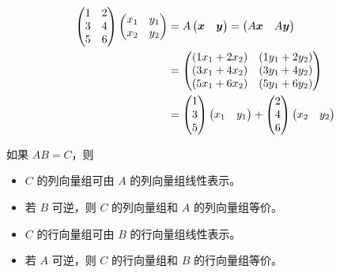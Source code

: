 \[ \begin{aligned}
		\begin{pmatrix}
			1 & 2 \\ 3 & 4 \\ 5 & 6
		\end{pmatrix} \begin{pmatrix}
			              x_1 & y_1 \\ x_2 & y_2
		              \end{pmatrix}
		 & = A \begin{pmatrix}
			       \boldsymbol{x} & \boldsymbol{y}
		       \end{pmatrix} = \begin{pmatrix}
			                       A\boldsymbol{x} & A\boldsymbol{y}
		                       \end{pmatrix}                                                          \\
		 & = \begin{pmatrix}
			     (1x_1 + 2x_2) & (1y_1 + 2y_2) \\ (3x_1 + 4x_2) & (3y_1 + 4y_2) \\ (5x_1 + 6x_2) & (5y_1 + 6y_2)
		     \end{pmatrix} \\
		 & = \begin{pmatrix}
			     1 \\ 3 \\ 5
		     \end{pmatrix} \begin{pmatrix}
			                   x_1 & y_1
		                   \end{pmatrix} + \begin{pmatrix}
			                                   2 \\ 4 \\ 6
		                                   \end{pmatrix} \begin{pmatrix}
			                                                 x_2 & y_2
		                                                 \end{pmatrix}
	\end{aligned} \]

如果 $AB = C$，则
\begin{itemize}
	\item $C$ 的列向量组可由 $A$ 的列向量组线性表示。
	\item 若 $B$ 可逆，则 $C$ 的列向量组和 $A$ 的列向量组等价。
	\item $C$ 的行向量组可由 $B$ 的行向量组线性表示。
	\item 若 $A$ 可逆，则 $C$ 的行向量组和 $B$ 的行向量组等价。
\end{itemize}

